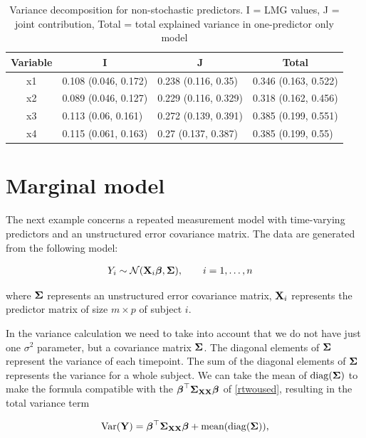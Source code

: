 \documentclass[11pt,a4paper,twoside]{book}
\begin{document}
\begin{table}[h]
\caption{Variance decomposition for non-stochastic predictors. I = LMG values, J = joint contribution, Total = total explained variance in one-predictor only model}
\centering
\begin{tabular}{clll}
  \toprule
  \multicolumn{1}{c}{\textbf{Variable}} & \multicolumn{1}{c}{\textbf{I}} &\multicolumn{1}{c}{\textbf{J}} & \multicolumn{1}{c}{\textbf{Total}} \\
  \hline
x1 & 0.108 (0.046, 0.172)  & 0.238 (0.116, 0.35)   & 0.346 (0.163, 0.522)  \\ 
x2 & 0.089 (0.046, 0.127)  & 0.229 (0.116, 0.329)   & 0.318 (0.162, 0.456)  \\ 
x3 & 0.113 (0.06, 0.161)  & 0.272 (0.139, 0.391)   & 0.385 (0.199, 0.551)  \\ 
x4 & 0.115 (0.061, 0.163)  & 0.27 (0.137, 0.387)   & 0.385 (0.199, 0.55)  \\ 
   \bottomrule
\end{tabular}
\label{tbl:repeatedcormod.tot}
\end{table}



\section{Marginal  model}

The next example concerns a repeated measurement model with time-varying predictors and an unstructured error covariance matrix. The data are generated from the following model:

\begin{align} 
&Y_{i} \sim \mathcal{N}({\mathbf{X}}_{i} {\boldsymbol{\beta}}, {\boldsymbol{\Sigma}}{}), \qquad i = 1, \dots, n
\end{align} 

where ${\boldsymbol{\Sigma}}{}$ represents an unstructured error covariance matrix, ${\mathbf{X}}_{i}$ represents the predictor matrix of size $m \times p$ of subject $i$.

In the variance calculation we need to take into account that we do not have just one $\sigma^2$ parameter, but a covariance matrix ${\boldsymbol{\Sigma}}{}$. The diagonal elements of ${\boldsymbol{\Sigma}}{}$ represent the variance of each timepoint. The sum of the diagonal elements of ${\boldsymbol{\Sigma}}{}$ represents the variance for a whole subject. We can  take the mean of $\operatorname{diag}({\boldsymbol{\Sigma}}{})$ to make the formula compatible with the ${\boldsymbol{\beta}}^\top {\boldsymbol{\Sigma}}{}_{{\mathbf{X}} {\mathbf{X}}}  {\boldsymbol{\beta}}$ of \eqref{rtwoused}, resulting in the total variance term

      \begin{align} 
        \operatorname{Var}({\mathbf{Y}}) = {\boldsymbol{\beta}}^\top {\boldsymbol{\Sigma}}{}_{{\mathbf{X}} {\mathbf{X}}}  {\boldsymbol{\beta}} + \text{mean}(\operatorname{diag}({\boldsymbol{\Sigma}}{})),
   \end{align}
\end{document}
